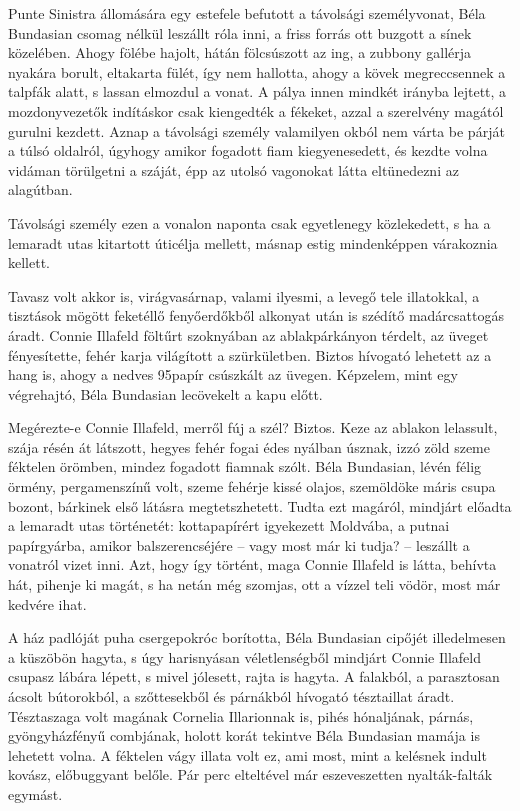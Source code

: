 \documentclass{IEEEtran}
\begin{document}
Punte Sinistra állomására egy estefele befutott a távolsági személyvonat, Béla
Bundasian csomag nélkül leszállt róla inni, a friss forrás ott buzgott a sínek
közelében. Ahogy fölébe hajolt, hátán fölcsúszott az ing, a zubbony gallérja
nyakára borult, eltakarta fülét, így nem hallotta, ahogy a kövek megreccsennek
a talpfák alatt, s lassan elmozdul a vonat. A pálya innen mindkét irányba
lejtett, a mozdonyvezetők indításkor csak kiengedték a fékeket, azzal a
szerelvény magától gurulni kezdett. Aznap a távolsági személy valamilyen okból
nem várta be párját a túlsó oldalról, úgyhogy amikor fogadott fiam
kiegyenesedett, és kezdte volna vidáman törülgetni a száját, épp az utolsó
vagonokat látta eltünedezni az alagútban.

Távolsági személy ezen a vonalon naponta csak egyetlenegy közlekedett, s ha a
lemaradt utas kitartott úticélja mellett, másnap estig mindenképpen várakoznia
kellett.

Tavasz volt akkor is, virágvasárnap, valami ilyesmi, a levegő tele illatokkal,
a tisztások mögött feketéllő fenyőerdőkből alkonyat után is szédítő
madárcsattogás áradt. Connie Illafeld föltűrt szoknyában az ablakpárkányon
térdelt, az üveget fényesítette, fehér karja világított a szürkületben. Biztos
hívogató lehetett az a hang is, ahogy a nedves 95papír csúszkált az üvegen.
Képzelem, mint egy végrehajtó, Béla Bundasian lecövekelt a kapu előtt.

Megérezte-e Connie Illafeld, merről fúj a szél? Biztos. Keze az ablakon
lelassult, szája résén át látszott, hegyes fehér fogai édes nyálban úsznak,
izzó zöld szeme féktelen örömben, mindez fogadott fiamnak szólt. Béla
Bundasian, lévén félig örmény, pergamenszínű volt, szeme fehérje kissé olajos,
szemöldöke máris csupa bozont, bárkinek első látásra megtetszhetett. Tudta ezt
magáról, mindjárt előadta a lemaradt utas történetét: kottapapírért igyekezett
Moldvába, a putnai papírgyárba, amikor balszerencséjére – vagy most már ki
tudja? – leszállt a vonatról vizet inni. Azt, hogy így történt, maga Connie
Illafeld is látta, behívta hát, pihenje ki magát, s ha netán még szomjas, ott
a vízzel teli vödör, most már kedvére ihat.

A ház padlóját puha csergepokróc borította, Béla Bundasian cipőjét
illedelmesen a küszöbön hagyta, s úgy harisnyásan véletlenségből mindjárt
Connie Illafeld csupasz lábára lépett, s mivel jólesett, rajta is hagyta. A
falakból, a parasztosan ácsolt bútorokból, a szőttesekből és párnákból
hívogató tésztaillat áradt. Tésztaszaga volt magának Cornelia Illarionnak is,
pihés hónaljának, párnás, gyöngyházfényű combjának, holott korát tekintve Béla
Bundasian mamája is lehetett volna. A féktelen vágy illata volt ez, ami most,
mint a kelésnek indult kovász, előbuggyant belőle. Pár perc elteltével már
eszeveszetten nyalták-falták egymást.
\end{document}
